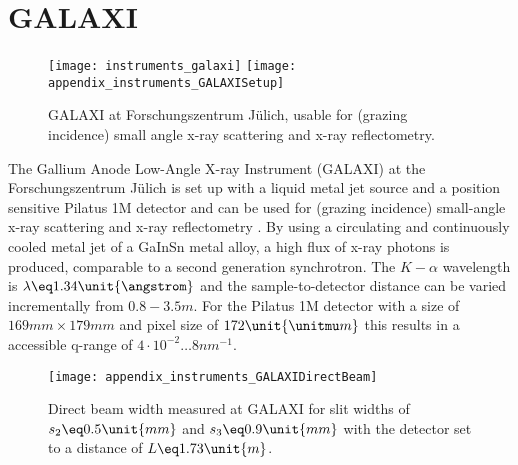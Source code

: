 \documentclass[\main/dresen_thesis.tex]{subfiles}
\begin{document}
  \section{GALAXI}\label{ch:appendix:lss:galaxi}
    \begin{figure}[h]
      \centering
      \texttt{[image: instruments\_galaxi]}
      \texttt{[image: appendix\_instruments\_GALAXISetup]}
      \caption{\label{fig:appendix:lss:galaxi}GALAXI at Forschungszentrum J\"ulich, usable for (grazing incidence) small angle x-ray scattering and x-ray reflectometry.}
    \end{figure}

    The Gallium Anode Low-Angle X-ray Instrument (GALAXI) at the Forschungszentrum J\"ulich is set up with a liquid metal jet source and a position sensitive Pilatus 1M detector and can be used for (grazing incidence) small-angle x-ray scattering and x-ray reflectometry \cite{FZJ_2016_GALAX}.
    By using a circulating and continuously cooled metal jet of a GaInSn metal alloy, a high flux of x-ray photons is produced, comparable to a second generation synchrotron.
    The $K-\alpha$ wavelength is $\lambda \eq 1.34 \unit{\angstrom}$ and the sample-to-detector distance can be varied incrementally from $0.8 - 3.5 \unit{m}$.
    For the Pilatus 1M detector with a size of $169 \unit{mm} \times 179 \unit{mm}$ and pixel size of $172 \unit{\unitmu m}$ this results in a accessible q-range of $4 \cdot 10^{-2} \dots 8 \unit{nm}^{-1}$.

    \begin{figure}[h]
      \centering
      \texttt{[image: appendix\_instruments\_GALAXIDirectBeam]}
      \caption{\label{fig:appendix:lss:galaxi:directBeam}Direct beam width measured at GALAXI for slit widths of $s_2 \eq 0.5 \unit{mm}$ and $s_3 \eq 0.9 \unit{mm}$ with the detector set to a distance of $L \eq 1.73 \unit{m}$.}
    \end{figure}
\end{document}
